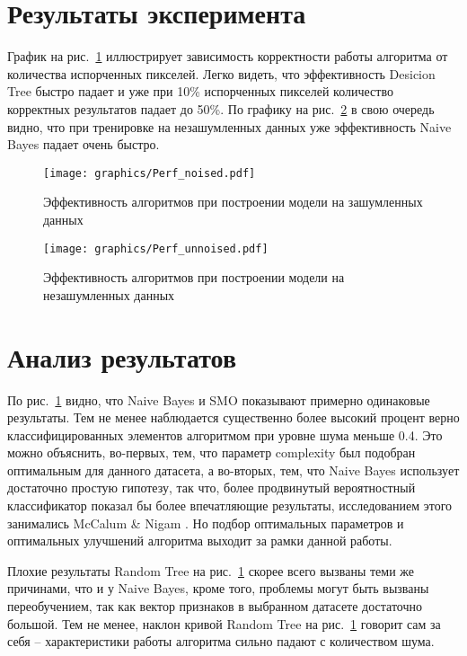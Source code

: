 \documentclass{article}
\begin{document}
\newpage
\section{Результаты эксперимента}
График на рис.~\ref{fig:perf1} иллюстрирует зависимость корректности работы алгоритма от количества испорченных пикселей. Легко видеть, что эффективность Desicion Tree быстро падает и уже при 10\% испорченных пикселей количество корректных результатов падает до 50\%.
По графику на рис.~\ref{fig:perf2} в свою очередь видно, что при тренировке на незашумленных данных уже эффективность Naive Bayes падает очень быстро.
\begin{figure}[ht!]
\texttt{[image: graphics/Perf\_noised.pdf]}
\captionsetup{justification=centering}
\caption{Эффективность алгоритмов при построении модели на зашумленных данных}
\label{fig:perf1}
\end{figure}


\begin{figure}[ht!]
\texttt{[image: graphics/Perf\_unnoised.pdf]}
\captionsetup{justification=centering}
\caption{Эффективность алгоритмов при построении модели на незашумленных данных}
\label{fig:perf2}
\end{figure}
\clearpage


\section{Анализ результатов}
\par
По рис.~\ref{fig:perf1} видно, что Naive Bayes и SMO показывают примерно одинаковые результаты. Тем не менее наблюдается существенно более высокий процент верно классифицированных элементов алгоритмом при уровне шума меньше 0.4. Это можно объяснить, во-первых, тем, что параметр complexity был подобран оптимальным для данного датасета, а во-вторых, тем, что Naive Bayes использует достаточно простую гипотезу, так что, более продвинутый вероятностный классификатор показал бы более впечатляющие результаты, исследованием этого занимались McCalum \& Nigam \cite{Mccallum1998}. Но подбор оптимальных параметров и оптимальных улучшений алгоритма выходит за рамки данной работы.

Плохие результаты Random Tree на рис.~\ref{fig:perf1} скорее всего вызваны теми же причинами, что и у Naive Bayes, кроме того, проблемы могут быть вызваны переобучением, так как вектор признаков в выбранном датасете достаточно большой. Тем не менее, наклон кривой Random Tree на рис.~\ref{fig:perf1} говорит сам за себя -- характеристики работы алгоритма сильно падают с количеством шума.
\end{document}
